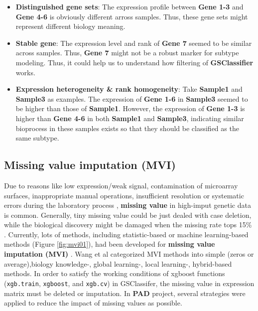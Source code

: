 \documentclass[
  12pt,
]{book}
\begin{document}
\begin{itemize}
\item
  \textbf{Distinguished gene sets}: The expression profile between \textbf{Gene 1-3} and \textbf{Gene 4-6} is obviously different arross samples. Thus, these gene sets might represent different biology meaning.
\item
  \textbf{Stable gene}: The expression level and rank of \textbf{Gene 7} seemed to be similar across samples. Thus, \textbf{Gene 7} might not be a robust marker for subtype modeling. Thus, it could help us to understand how filtering of \textbf{GSClassifier} works.
\item
  \textbf{Expression heterogeneity \& rank homogeneity}: Take \textbf{Sample1} and \textbf{Sample3} as examples. The expression of \textbf{Gene 1-6} in \textbf{Sample3} seemed to be higher than those of \textbf{Sample1}. However, the expression of \textbf{Gene 1-3} is higher than \textbf{Gene 4-6} in both \textbf{Sample1} and \textbf{Sample3}, indicating similar bioprocess in these samples exists so that they should be classified as the same subtype.
\end{itemize}

\hypertarget{missing-value-imputation-mvi}{%
\subsection{Missing value imputation (MVI)}\label{missing-value-imputation-mvi}}

Due to reasons like low expression/weak signal, contamination of microarray surfaces, inappropriate manual operations, insufficient resolution or systematic errors during the laboratory process \citep{RN387, RN389, RN382}, \textbf{missing value} in high-imput genetic data is common. Generally, tiny missing value could be just dealed with case deletion, while the biological discovery might be damaged when the missing rate tops 15\% \citep{RN392, RN386}. Currently, lots of methods, including statistic-based or machine learning-based methods (Figure \ref{fig:mvi01}), had been developed for \textbf{missing value imputation (MVI)} \citep{RN386}. Wang et al \citep{RN384} categorized MVI methods into simple (zeros or average),biology knowledge-, global learning-, local learning-, hybrid-based methods. In order to satisfy the working conditions of xgboost \citep{xgboost} functions (\texttt{xgb.train}, \texttt{xgboost}, and \texttt{xgb.cv}) in GSClassifer, the missing value in expression matrix must be deleted or imputation. In \textbf{PAD} project, several strategies were applied to reduce the impact of missing values as possible.
\end{document}
